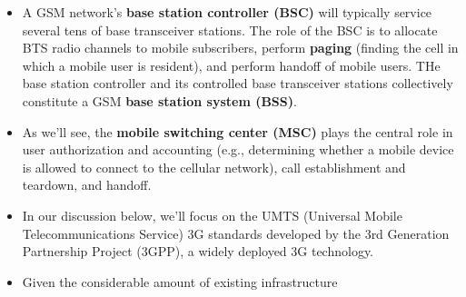 \begin{itemize}
\item
A GSM network's \textbf{base station controller (BSC)} will typically service several tens of base transceiver stations. The role of the BSC is to allocate BTS radio channels to mobile subscribers, perform \textbf{paging} (finding the cell in which a mobile user is resident), and perform handoff of mobile users. THe base station controller and its controlled base transceiver stations collectively constitute a GSM \textbf{base station system (BSS)}.

\item
As we'll see, the \textbf{mobile switching center (MSC)} plays the central role in user authorization and accounting (e.g., determining whether a mobile device is allowed to connect to the cellular network), call establishment and teardown, and handoff.

\item
In our discussion below, we'll focus on the UMTS (Universal Mobile Telecommunications Service) 3G standards developed by the 3rd Generation Partnership Project (3GPP), a widely deployed 3G technology.

\item
Given the considerable amount of existing infrastructure



















\end{itemize}
